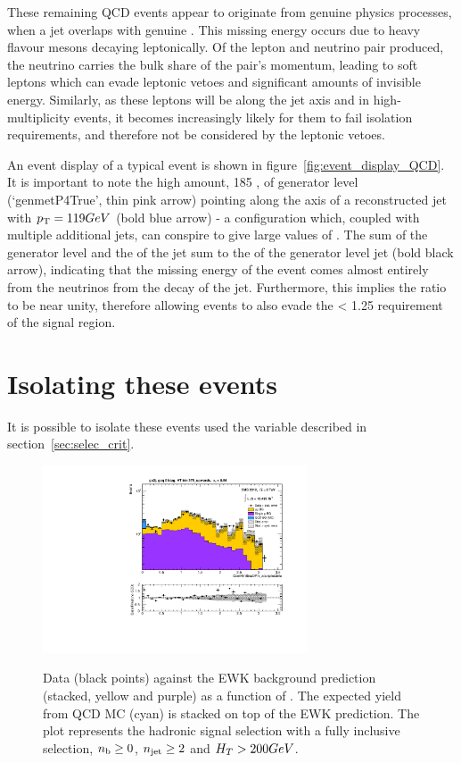 These remaining QCD events appear to originate from genuine physics processes,
when a jet overlaps with genuine \met. This missing energy occurs due to heavy
flavour mesons decaying leptonically. Of the lepton and neutrino pair produced,
the neutrino
carries the bulk share of the pair's momentum, leading to soft leptons which
can evade leptonic vetoes and significant amounts of invisible energy. Similarly,
as these leptons will be along the jet axis and in high-multiplicity events,
it becomes increasingly likely for them to fail isolation requirements, and
therefore not be considered by the leptonic vetoes.

An event display of a typical event is shown in figure~\ref{fig:event_display_QCD}.
It is important to note the high amount, 185 \gev, of generator level
\met (`genmetP4True', thin pink arrow) pointing along the axis of a reconstructed
jet with ${p_{\text T}} = 119 GeV$ (bold blue arrow) - a configuration which,
coupled with multiple additional jets, can conspire to give
large values of \alphat. The sum of the generator level \met and
the \Pt of the jet sum to the \Pt of the generator level jet (bold black arrow),
indicating that the missing energy of the event comes almost entirely from the
neutrinos from the decay of the jet. Furthermore, this implies the ratio
\mhtmet to be near unity, therefore allowing events to also evade the \mhtmet <
1.25 requirement of the signal region.

\section{Isolating these events}

It is possible to isolate these events used the \mindphistar variable described
in section~\ref{sec:selec_crit}.

\begin{figure}[h!]
\centering
\includegraphics[width=0.7\textwidth]
{Figs/datapred/Prediction_ComMinBiasDPhi_acceptedJets_all_375_upwards_QCD.pdf}
\label{fig:data_pred_dphistar_qcd}
\caption{Data (black points) against the EWK background prediction 
(stacked, yellow and purple) as a function of \mindphistar. The expected yield
from QCD MC (cyan) is stacked on top of the EWK prediction. The plot represents
the hadronic signal selection with a fully inclusive selection, $n_{\text{b}} \geq 0$,
$n_{\text{jet}} \geq 2$ and $H_T > 200 GeV$.}
\end{figure}

